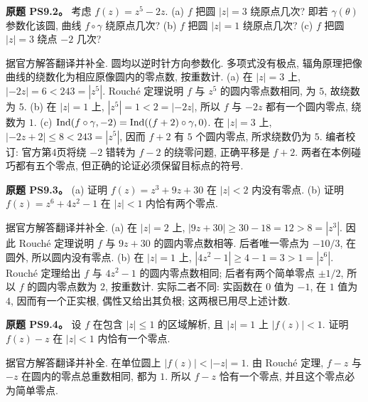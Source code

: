 \begin{exercise}
\textbf{原题 PS9.2。}\label{ass:ps9-2}
考虑 $f(z)=z^5-2z$.
(a) $f$ 把圆 $|z|=3$ 绕原点几次? 即若 $\gamma(\theta)$ 参数化该圆, 曲线 $f\circ\gamma$ 绕原点几次?
(b) $f$ 把圆 $|z|=1$ 绕原点几次?
(c) $f$ 把圆 $|z|=3$ 绕点 $-2$ 几次?
\end{exercise}
\begin{solution}
据官方解答翻译并补全. 圆均以逆时针方向参数化. 多项式没有极点, 辐角原理把像曲线的绕数化为相应原像圆内的零点数, 按重数计.
(a) 在 $|z|=3$ 上, $|-2z|=6<243=|z^5|$. Rouché 定理说明 $f$ 与 $z^5$ 的圆内零点数相同, 为 $5$, 故绕数为 $5$.
(b) 在 $|z|=1$ 上, $|z^5|=1<2=|-2z|$, 所以 $f$ 与 $-2z$ 都有一个圆内零点, 绕数为 $1$.
(c) $\operatorname{Ind}(f\circ\gamma,-2)=\operatorname{Ind}((f+2)\circ\gamma,0)$. 在 $|z|=3$ 上, $|-2z+2|\le8<243=|z^5|$, 因而 $f+2$ 有 $5$ 个圆内零点, 所求绕数仍为 $5$.
编者校订: 官方第4页将绕 $-2$ 错转为 $f-2$ 的绕零问题, 正确平移是 $f+2$. 两者在本例碰巧都有五个零点, 但正确的论证必须保留目标点的符号.
\end{solution}

\begin{exercise}
\textbf{原题 PS9.3。}\label{ass:ps9-3}
(a) 证明 $f(z)=z^3+9z+30$ 在 $|z|<2$ 内没有零点.
(b) 证明 $f(z)=z^6+4z^2-1$ 在 $|z|<1$ 内恰有两个零点.
\end{exercise}
\begin{solution}
据官方解答翻译并补全.
(a) 在 $|z|=2$ 上, $|9z+30|\ge30-18=12>8=|z^3|$. 因此 Rouché 定理说明 $f$ 与 $9z+30$ 的圆内零点数相等. 后者唯一零点为 $-10/3$, 在圆外, 所以圆内没有零点.
(b) 在 $|z|=1$ 上, $|4z^2-1|\ge4-1=3>1=|z^6|$. Rouché 定理给出 $f$ 与 $4z^2-1$ 的圆内零点数相同; 后者有两个简单零点 $\pm1/2$, 所以 $f$ 的圆内零点数为 $2$, 按重数计. 实际二者不同: 实函数在 $0$ 值为 $-1$, 在 $1$ 值为 $4$, 因而有一个正实根, 偶性又给出其负根; 这两根已用尽上述计数.
\end{solution}

\begin{exercise}
\textbf{原题 PS9.4。}\label{ass:ps9-4}
设 $f$ 在包含 $|z|\le1$ 的区域解析, 且 $|z|=1$ 上 $|f(z)|<1$. 证明 $f(z)-z$ 在 $|z|<1$ 内恰有一个零点.
\end{exercise}
\begin{solution}
据官方解答翻译并补全. 在单位圆上 $|f(z)|<|-z|=1$. 由 Rouché 定理, $f-z$ 与 $-z$ 在圆内的零点总重数相同, 都为 $1$. 所以 $f-z$ 恰有一个零点, 并且这个零点必为简单零点.
\end{solution}

